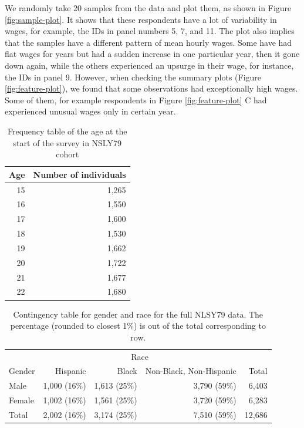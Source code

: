 \documentclass{article}
\begin{document}
We randomly take 20 samples from the data and plot them, as shown in Figure \ref{fig:sample-plot}. It shows that these respondents have a lot of variability in wages, for example, the IDs in panel numbers 5, 7, and 11. The plot also implies that the samples have a different pattern of mean hourly wages. Some have had flat wages for years but had a sudden increase in one particular year, then it gone down again, while the others experienced an upsurge in their wage, for instance, the IDs in panel 9.
However, when checking the summary plots (Figure \ref{fig:feature-plot}), we found that some observations had exceptionally high wages. Some of them, for example respondents in Figure \ref {fig:feature-plot} C had experienced unusual wages only in certain year.

\begin{table}

\caption{\label{tab:age-table}Frequency table of the age at the start of the survey in NSLY79 cohort}
\centering
\begin{tabular}[t]{rr}
\toprule
Age & Number of individuals\\
\midrule
15 & 1,265\\
16 & 1,550\\
17 & 1,600\\
18 & 1,530\\
19 & 1,662\\
20 & 1,722\\
21 & 1,677\\
22 & 1,680\\
\bottomrule
\end{tabular}
\end{table}

\begin{table}

\caption{\label{tab:gender-race-table}Contingency table for gender and race for the full NLSY79 data. The percentage (rounded to closest 1\%) is out of the total corresponding to row.}
\centering
\begin{tabular}[t]{lrrrr}
\toprule
\multicolumn{1}{c}{ } & \multicolumn{3}{c}{Race} & \multicolumn{1}{c}{ } \\
\cmidrule(l{3pt}r{3pt}){2-4}
Gender & Hispanic & Black & Non-Black, Non-Hispanic & Total\\
\midrule
Male & 1,000 (16\%) & 1,613 (25\%) & 3,790 (59\%) & 6,403\\
Female & 1,002 (16\%) & 1,561 (25\%) & 3,720 (59\%) & 6,283\\
\midrule
Total & 2,002 (16\%) & 3,174 (25\%) & 7,510 (59\%) & 12,686\\
\bottomrule
\end{tabular}
\end{table}
\end{document}
